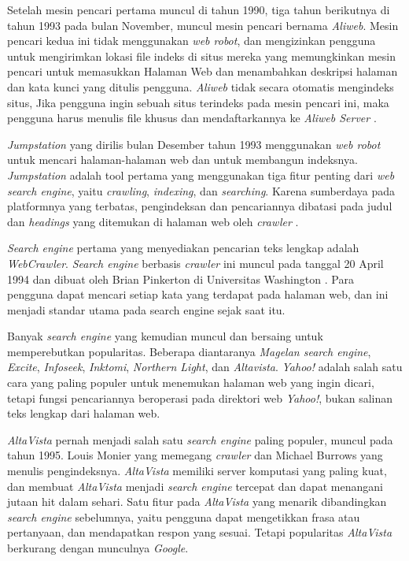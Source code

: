 Setelah mesin pencari pertama muncul di tahun 1990, tiga tahun berikutnya di tahun 1993 pada bulan November, muncul mesin pencari bernama \emph{Aliweb}. Mesin pencari kedua ini tidak menggunakan \emph{web robot}, dan mengizinkan pengguna untuk mengirimkan lokasi file indeks di situs mereka yang memungkinkan mesin pencari untuk memasukkan Halaman Web dan menambahkan deskripsi halaman dan kata kunci yang ditulis pengguna. \emph{Aliweb} tidak secara otomatis mengindeks situs, Jika pengguna ingin sebuah situs terindeks pada mesin pencari ini, maka pengguna harus menulis file khusus dan mendaftarkannya ke \emph{Aliweb Server} \cite{seymour2011history}.

\emph{Jumpstation} yang dirilis bulan Desember tahun 1993 menggunakan \emph{web robot} untuk mencari halaman-halaman web dan untuk membangun indeksnya. \emph{Jumpstation} adalah tool pertama yang menggunakan tiga fitur penting dari \emph{web search engine}, yaitu \emph{crawling}, \emph{indexing}, dan \emph{searching}. Karena sumberdaya pada platformnya yang terbatas, pengindeksan dan pencariannya dibatasi pada judul dan \emph{headings} yang ditemukan di halaman web oleh \emph{crawler} \cite{seymour2011history}.

\emph{Search engine} pertama yang menyediakan pencarian teks lengkap adalah \emph{WebCrawler}. \emph{Search engine} berbasis \emph{crawler} ini muncul pada tanggal 20 April 1994 dan dibuat oleh Brian Pinkerton di Universitas Washington \cite{seymour2011history}. Para pengguna dapat mencari setiap kata yang terdapat pada halaman web, dan ini menjadi standar utama pada search engine sejak saat itu.

Banyak \emph{search engine} yang kemudian muncul dan bersaing untuk memperebutkan popularitas. Beberapa diantaranya \emph{Magelan search engine}, \emph{Excite}, \emph{Infoseek}, \emph{Inktomi}, \emph{Northern Light}, dan \emph{Altavista}. \emph{Yahoo!} adalah salah satu cara yang paling populer untuk menemukan halaman web yang ingin dicari, tetapi fungsi pencariannya beroperasi pada direktori web \emph{Yahoo!}, bukan salinan teks lengkap dari halaman web.

\emph{AltaVista} pernah menjadi salah satu \emph{search engine} paling populer, muncul pada tahun 1995. Louis Monier yang memegang \emph{crawler} dan Michael Burrows yang menulis pengindeksnya. \emph{AltaVista} memiliki server komputasi yang paling kuat, dan membuat \emph{AltaVista} menjadi \emph{search engine} tercepat dan dapat menangani jutaan hit dalam sehari. Satu fitur pada \emph{AltaVista} yang menarik dibandingkan \emph{search engine} sebelumnya, yaitu pengguna dapat mengetikkan frasa atau pertanyaan, dan mendapatkan respon yang sesuai. Tetapi popularitas \emph{AltaVista} berkurang dengan munculnya \emph{Google}.

